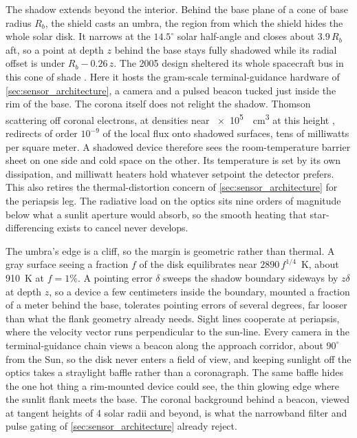 \documentclass{article}
\begin{document}
The shadow extends beyond the interior. Behind the base plane of a cone of base radius $R_b$, the shield casts an umbra, the region from which the shield hides the whole solar disk. It narrows at the $14.5^{\circ}$ solar half-angle and closes about $3.9\,R_b$ aft, so a point at depth $z$ behind the base stays fully shadowed while its radial offset is under $R_b - 0.26\,z$. The 2005 design sheltered its whole spacecraft bus in this cone of shade \cite{mccomas2005solar}. Here it hosts the gram-scale terminal-guidance hardware of \autoref{sec:sensor_architecture}, a camera and a pulsed beacon tucked just inside the rim of the base. The corona itself does not relight the shadow. Thomson scattering off coronal electrons, at densities near \SI{e5}{\per\cubic\centi\meter} at this height \cite{leblanc1998corona}, redirects of order $10^{-9}$ of the local flux onto shadowed surfaces, tens of milliwatts per square meter. A shadowed device therefore sees the room-temperature barrier sheet on one side and cold space on the other. Its temperature is set by its own dissipation, and milliwatt heaters hold whatever setpoint the detector prefers. This also retires the thermal-distortion concern of \autoref{sec:sensor_architecture} for the periapsis leg. The radiative load on the optics sits nine orders of magnitude below what a sunlit aperture would absorb, so the smooth heating that star-differencing exists to cancel never develops.

The umbra's edge is a cliff, so the margin is geometric rather than thermal. A gray surface seeing a fraction $f$ of the disk equilibrates near $2890\,f^{1/4}$~\si{\kelvin}, about \SI{910}{\kelvin} at $f = 1\%$. A pointing error $\delta$ sweeps the shadow boundary sideways by $z\delta$ at depth $z$, so a device a few centimeters inside the boundary, mounted a fraction of a meter behind the base, tolerates pointing errors of several degrees, far looser than what the flank geometry already needs. Sight lines cooperate at periapsis, where the velocity vector runs perpendicular to the sun-line. Every camera in the terminal-guidance chain views a beacon along the approach corridor, about $90^{\circ}$ from the Sun, so the disk never enters a field of view, and keeping sunlight off the optics takes a straylight baffle rather than a coronagraph. The same baffle hides the one hot thing a rim-mounted device could see, the thin glowing edge where the sunlit flank meets the base. The coronal background behind a beacon, viewed at tangent heights of 4 solar radii and beyond, is what the narrowband filter and pulse gating of \autoref{sec:sensor_architecture} already reject.
\end{document}
